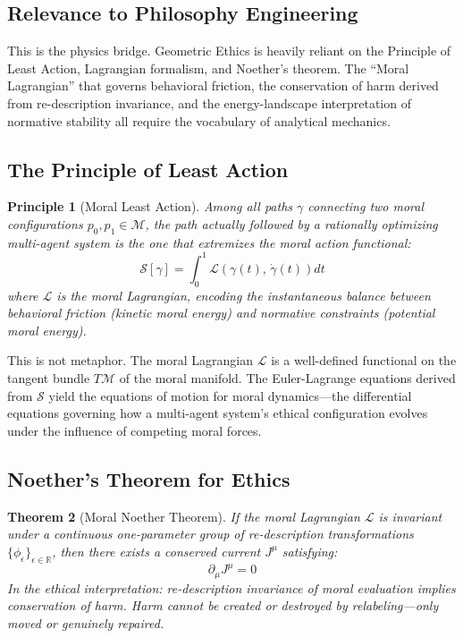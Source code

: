 \documentclass[12pt,letterpaper]{article}
\newtheorem{theorem}{Theorem}[section]
\theoremstyle{definition}
\theoremstyle{plain}
\newtheorem{principle}[theorem]{Principle}
\newcommand{\R}{\mathbb{R}}
\newcommand{\calM}{\mathcal{M}}
\newcommand{\Lag}{\mathcal{L}}
\begin{document}
\subsection{Relevance to Philosophy Engineering}

This is the physics bridge. Geometric Ethics is heavily reliant on the Principle of Least Action, Lagrangian formalism, and Noether's theorem. The ``Moral Lagrangian'' that governs behavioral friction, the conservation of harm derived from re-description invariance, and the energy-landscape interpretation of normative stability all require the vocabulary of analytical mechanics.

\subsection{The Principle of Least Action}

\begin{principle}[Moral Least Action]
\label{princ:least-action}
Among all paths $\gamma$ connecting two moral configurations $p_0, p_1 \in \calM$, the path actually followed by a rationally optimizing multi-agent system is the one that extremizes the \emph{moral action functional}:
\begin{equation}
\mathcal{S}[\gamma] = \int_0^1 \Lag\!\left(\gamma(t),\, \dot{\gamma}(t)\right) dt
\end{equation}
where $\Lag$ is the \emph{moral Lagrangian}, encoding the instantaneous balance between behavioral friction (kinetic moral energy) and normative constraints (potential moral energy).
\end{principle}

This is not metaphor. The moral Lagrangian $\Lag$ is a well-defined functional on the tangent bundle $T\calM$ of the moral manifold. The Euler-Lagrange equations derived from $\mathcal{S}$ yield the equations of motion for moral dynamics---the differential equations governing how a multi-agent system's ethical configuration evolves under the influence of competing moral forces.

\subsection{Noether's Theorem for Ethics}

\begin{theorem}[Moral Noether Theorem]
\label{thm:noether}
If the moral Lagrangian $\Lag$ is invariant under a continuous one-parameter group of re-description transformations $\{\phi_\epsilon\}_{\epsilon \in \R}$, then there exists a conserved current $J^\mu$ satisfying:
\begin{equation}
\partial_\mu J^\mu = 0
\end{equation}
In the ethical interpretation: re-description invariance of moral evaluation implies conservation of harm. Harm cannot be created or destroyed by relabeling---only moved or genuinely repaired.
\end{theorem}
\end{document}
